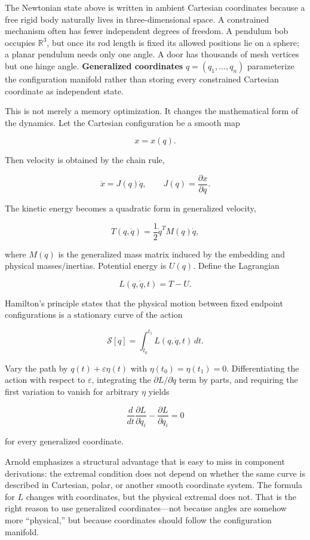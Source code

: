 \hypertarget{06-engine-ii-ch033-generalized-coordinates-describe-the-configuration-the-mechanism-can-actually-have}{}

The Newtonian state above is written in ambient Cartesian coordinates because a free rigid body naturally lives in three-dimensional space. A constrained mechanism often has fewer independent degrees of freedom. A pendulum bob occupies \(\mathbb R^3\), but once its rod length is fixed its allowed positions lie on a sphere; a planar pendulum needs only one angle. A door has thousands of mesh vertices but one hinge angle. \textbf{Generalized coordinates} \(q=(q_1,\ldots,q_n)\) parameterize the configuration manifold rather than storing every constrained Cartesian coordinate as independent state.

This is not merely a memory optimization. It changes the mathematical form of the dynamics. Let the Cartesian configuration be a smooth map

\[
x=x(q).
\]

Then velocity is obtained by the chain rule,

\[
\dot x
=
J(q)\dot q,
\qquad
J(q)=\frac{\partial x}{\partial q}.
\]

The kinetic energy becomes a quadratic form in generalized velocity,

\[
T(q,\dot q)
=
\frac12
\dot q^T M(q)\dot q,
\]

where \(M(q)\) is the generalized mass matrix induced by the embedding and physical masses/inertias. Potential energy is \(U(q)\). Define the Lagrangian

\[
L(q,\dot q,t)=T-U.
\]

Hamilton's principle states that the physical motion between fixed endpoint configurations is a stationary curve of the action

\[
\mathcal S[q]
=
\int_{t_0}^{t_1}
L(q,\dot q,t)\,dt.
\]

Vary the path by \(q(t)+\varepsilon\eta(t)\) with \(\eta(t_0)=\eta(t_1)=0\). Differentiating the action with respect to \(\varepsilon\), integrating the \(\partial L/\partial\dot q\) term by parts, and requiring the first variation to vanish for arbitrary \(\eta\) yields

\[
\boxed{
\frac{d}{dt}
\frac{\partial L}{\partial\dot q_i}
-
\frac{\partial L}{\partial q_i}
=
0
}
\]

for every generalized coordinate.

Arnold emphasizes a structural advantage that is easy to miss in component derivations: the extremal condition does not depend on whether the same curve is described in Cartesian, polar, or another smooth coordinate system. The formula for \(L\) changes with coordinates, but the physical extremal does not. That is the right reason to use generalized coordinates---not because angles are somehow more ``physical,'' but because coordinates should follow the configuration manifold.

